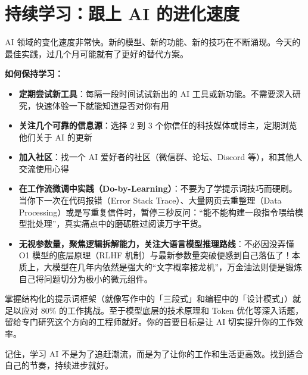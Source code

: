 \section{持续学习：跟上 AI 的进化速度}

AI 领域的变化速度非常快。新的模型、新的功能、新的技巧在不断涌现。今天的最佳实践，过几个月可能就有了更好的替代方案。

\textbf{如何保持学习：}

\begin{itemize}
  \item \textbf{定期尝试新工具}：每隔一段时间试试新出的 AI 工具或新功能。不需要深入研究，快速体验一下就能知道是否对你有用
  \item \textbf{关注几个可靠的信息源}：选择 2 到 3 个你信任的科技媒体或博主，定期浏览他们关于 AI 的更新
  \item \textbf{加入社区}：找一个 AI 爱好者的社区（微信群、论坛、Discord 等），和其他人交流使用心得
  \item \textbf{在工作流微调中实践（Do-by-Learning）}：不要为了学提示词技巧而硬刷。当你下一次在代码报错（Error Stack Trace）、大量网页去重整理（Data Processing）或是写重复信件时，暂停三秒反问：“能不能构建一段指令喂给模型批处理”，真实痛点中的磨砺胜过阅读万字干货。
  \item \textbf{无视参数量，聚焦逻辑拆解能力，关注大语言模型推理路线}：不必因没弄懂 O1 模型的底层原理（RLHF 机制）与最新参数量突破便感到自己落伍了！本质上，大模型在几年内依然是强大的“文字概率接龙机”，万金油法则便是锻炼自己将问题切分为极小的微元组件。
\end{itemize}

\begin{tipbox}
掌握结构化的提示词框架（就像写作中的「三段式」和编程中的「设计模式」）就足以应对 80\% 的工作挑战。至于模型底层的技术原理和 Token 优化等深入话题，留给专门研究这个方向的工程师就好。你的首要目标是让 AI 切实提升你的工作效率。
\end{tipbox}

记住，学习 AI 不是为了追赶潮流，而是为了让你的工作和生活更高效。找到适合自己的节奏，持续进步就好。
